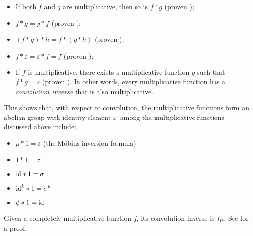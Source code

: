 \documentclass[12pt]{article}
\begin{document}
\begin{itemize}
\item If both $f$ and $g$ are multiplicative, then so is $f*g$ (proven );
\item $f*g = g*f$ (proven );
\item $(f*g)*h = f*(g*h)$ (proven );
\item $f*\varepsilon = \varepsilon *f = f$ (proven );
\item If $f$ is multiplicative, there exists a multiplicative function $g$ such that $f*g=\varepsilon$ (proven ).  In other words, every multiplicative function has a \emph{convolution inverse} that is also multiplicative.
\end{itemize}

This shows that, with respect to convolution, the multiplicative functions form an abelian group with identity element $\varepsilon$.  among the multiplicative functions discussed above include: 

\begin{itemize}
\item $\mu*1=\varepsilon$ (the M\"{o}bius inversion formula)
\item $1*1=\tau$ 
\item $\hbox{id}*1 = \sigma$
\item $\hbox{id}^{k}*1 = \sigma ^{k}$
\item $\phi*1 = \hbox{id}$
\end{itemize}

Given a completely multiplicative function $f$, its convolution inverse is $f\mu$.  See  for a proof.
\end{document}
